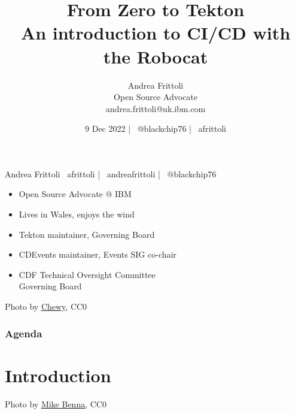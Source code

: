 \documentclass[aspectratio=169,11pt,hyperref={colorlinks=true}]{beamer}
\title{From Zero to Tekton\\\normalsize{An introduction to CI/CD with the Robocat \faRobot\faCat}}
\date[9 Dec 2022 Meet\&Learn]{9 Dec 2022 | \faTwitter ~@blackchip76 | \faGithub ~afrittoli}
\author[Andrea Frittoli]{%
  Andrea Frittoli \\
  Open Source Advocate \\
  andrea.frittoli@uk.ibm.com
}
\begin{document}
\begin{frame}
\titlepage{}
\end{frame}

\begin{speakerframe}{Andrea Frittoli}%
  {%
  \faGithub ~afrittoli | \faLinkedin ~andreafrittoli | \faTwitter ~@blackchip76
  }%
  {%
  \begin{itemize}
    \item{Open Source Advocate @ IBM}
    \item{Lives in Wales, enjoys the wind}
    \item{Tekton maintainer, Governing Board}
    \item{CDEvents maintainer, Events SIG co-chair}
    \item{CDF Technical Oversight Committee \\ Governing Board}
  \end{itemize}
  }%
\end{speakerframe}

\begin{lpicrblack}{%
  Photo by \href{https://unsplash.com/@chewy}{\underline{Chewy}}, CC0
  }%
  {%
  \tableofcontents
  }%
  {}
  \frametitle{Agenda}
\end{lpicrblack}

\section[Introduction]{Introduction}

\begin{sectionwithpic}{Photo by \href{https://unsplash.com/@mbenna}{\underline{Mike Benna}}, CC0}
\end{sectionwithpic}
\end{document}

